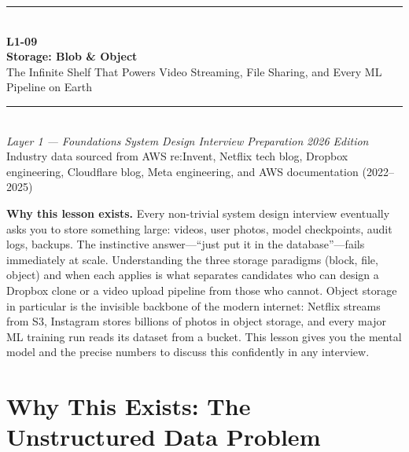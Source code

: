 \documentclass[11pt,a4paper]{article}
\begin{document}
\begin{titlepage}
\vspace*{2cm}
\begin{center}
  {\color{primary}\rule{\linewidth}{3pt}}\\[12pt]
  {\huge\bfseries\color{highlight} L1-09}\\[6pt]
  {\Huge\bfseries\color{primary} Storage: Blob \& Object}\\[10pt]
  {\large\color{primary!70} The Infinite Shelf That Powers Video Streaming, File Sharing, and Every ML Pipeline on Earth}\\[20pt]
  {\color{primary}\rule{\linewidth}{1pt}}\\[16pt]
  {\normalsize\color{primary!70}
    \textit{Layer 1 --- Foundations} \quad\textbullet\quad
    \textit{System Design Interview Preparation} \quad\textbullet\quad
    \textit{2026 Edition}
  }\\[8pt]
  {\small\color{primary!60} Industry data sourced from AWS re:Invent, Netflix tech blog, Dropbox engineering, Cloudflare blog, Meta engineering, and AWS documentation (2022--2025)}
\end{center}
\vfill
\begin{insightbox}
\textbf{Why this lesson exists.} Every non-trivial system design interview eventually asks you to store something large: videos, user photos, model checkpoints, audit logs, backups. The instinctive answer---``just put it in the database''---fails immediately at scale. Understanding the three storage paradigms (block, file, object) and when each applies is what separates candidates who can design a Dropbox clone or a video upload pipeline from those who cannot. Object storage in particular is the invisible backbone of the modern internet: Netflix streams from S3, Instagram stores billions of photos in object storage, and every major ML training run reads its dataset from a bucket. This lesson gives you the mental model and the precise numbers to discuss this confidently in any interview.
\end{insightbox}
\vspace{1cm}
\tableofcontents
\end{titlepage}

\section{Why This Exists: The Unstructured Data Problem}
\end{document}
